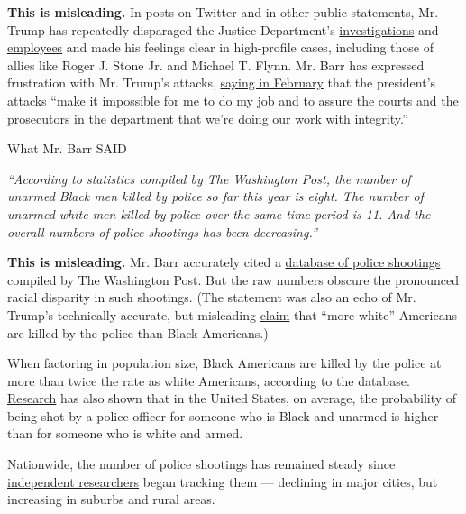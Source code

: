 \textbf{This is misleading.} In posts on Twitter and in other public
statements, Mr. Trump has repeatedly disparaged the Justice Department's
\href{https://www.nytimes3xbfgragh.onion/interactive/2019/02/19/us/politics/trump-attacks-obstruction-investigation.html}{investigations}
and
\href{https://www.nytimes3xbfgragh.onion/2020/02/20/us/politics/trump-attacks-justice-system.html}{employees}
and made his feelings clear in high-profile cases, including those of
allies like Roger J. Stone Jr. and Michael T. Flynn. Mr. Barr has
expressed frustration with Mr. Trump's attacks,
\href{https://www.nytimes3xbfgragh.onion/2020/02/13/us/politics/william-barr-trump.html}{saying
in February} that the president's attacks ``make it impossible for me to
do my job and to assure the courts and the prosecutors in the department
that we're doing our work with integrity.''

What Mr. Barr SAID

\emph{``According to statistics compiled by The Washington Post, the
number of unarmed Black men killed by police so far this year is eight.
The number of unarmed white men killed by police over the same time
period is 11. And the overall numbers of police shootings has been
decreasing.''}

\textbf{This is misleading.} Mr. Barr accurately cited a
\href{https://www.washingtonpost.com/graphics/investigations/police-shootings-database/}{database
of police shootings} compiled by The Washington Post. But the raw
numbers obscure the pronounced racial disparity in such shootings. (The
statement was also an echo of Mr. Trump's technically accurate, but
misleading
\href{https://www.nytimes3xbfgragh.onion/2020/07/14/us/politics/trump-fact-check-biden-police-coronavirus-china.html}{claim}
that ``more white'' Americans are killed by the police than Black
Americans.)

When factoring in population size, Black Americans are killed by the
police at more than twice the rate as white Americans, according to the
database.
\href{https://journals.plos.org/plosone/article?id=10.1371/journal.pone.0141854}{Research}
has also shown that in the United States, on average, the probability of
being shot by a police officer for someone who is Black and unarmed is
higher than for someone who is white and armed.

Nationwide, the number of police shootings has remained steady since
\href{https://mappingpoliceviolence.org/}{independent researchers} began
tracking them --- declining in major cities, but increasing in suburbs
and rural areas.

